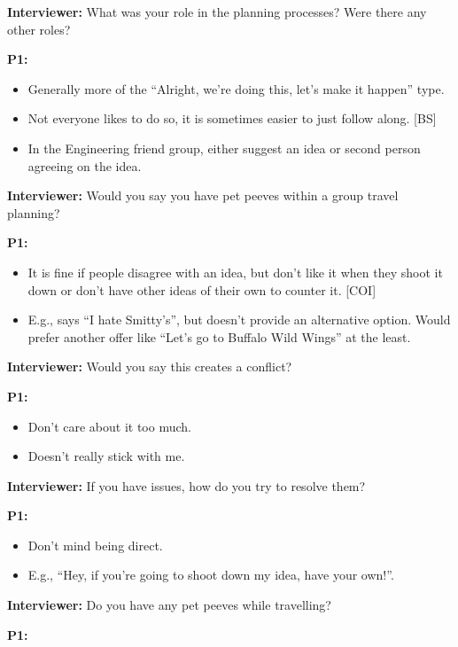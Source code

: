 \documentclass[12pt,a4paper]{article}
\begin{document}
\textbf{Interviewer:} What was your role in the planning processes? Were there any other roles? 

\textbf{P1: }

\begin{itemize}
    \item Generally more of the “Alright, we’re doing this, let’s make it happen” type. 
    \item Not everyone likes to do so, it is sometimes easier to just follow along. [BS]
    \item In the Engineering friend group, either suggest an idea or second person agreeing on the idea. 
\end{itemize}

\textbf{Interviewer:} Would you say you have pet peeves within a group travel planning? 

\textbf{P1: }

\begin{itemize}
    \item It is fine if people disagree with an idea, but don’t like it when they shoot it down or don't have other ideas of their own to counter it. [COI]
    \item E.g., says “I hate Smitty’s”, but doesn’t provide an alternative option. Would prefer another offer like “Let’s go to Buffalo Wild Wings” at the least. 
\end{itemize}

\textbf{Interviewer:} Would you say this creates a conflict? 

\textbf{P1:}

\begin{itemize}
    \item Don’t care about it too much.
    \item Doesn’t really stick with me.
\end{itemize}

\textbf{Interviewer:} If you have issues, how do you try to resolve them? 

\textbf{P1:}

\begin{itemize}
    \item Don’t mind being direct. 
    \item E.g., “Hey, if you’re going to shoot down my idea, have your own!”.
\end{itemize}

\textbf{Interviewer:} Do you have any pet peeves while travelling?  

\textbf{P1:}
\end{document}
